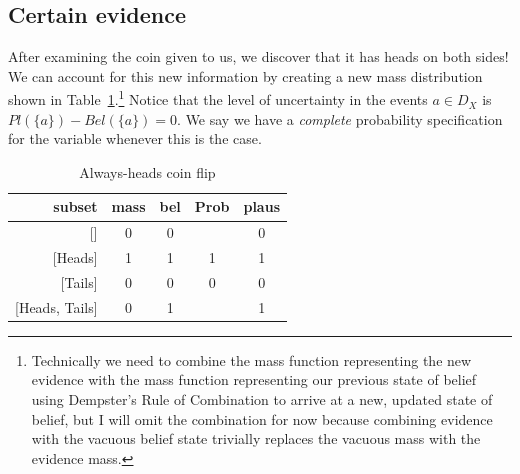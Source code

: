 \documentclass[letterpaper]{article}
\begin{document}
\subsection{Certain evidence}
After examining the coin given to us, we discover that it has heads on both sides!  We can account for this new information by creating a new mass distribution shown in Table~\ref{tab:CoinFlipAllHeads}.\footnote{Technically we need to combine the mass function representing the new evidence with the mass function representing our previous state of belief using Dempster's Rule of Combination to arrive at a new, updated state of belief, but I will omit the combination for now because combining evidence with the vacuous belief state trivially replaces the vacuous mass with the evidence mass.}
Notice that the level of uncertainty in the events $a \in D_X$ is $Pl(\{a\})-Bel(\{a\})=0$.  We say we have a \textit{complete} probability specification for the variable whenever this is the case.  

\begin{table}[htbp]
\centering
\caption{Always-heads coin flip}
\begin{tabular}{rcccc}
\toprule
                subset&mass &bel  &Prob &plaus\\
\midrule
                    {[]}&0    &0    &     &0    \\
               {[Heads]}&1    &1    &1    &1    \\
               {[Tails]}&0    &0    &0    &0    \\
        {[Heads, Tails]}&0    &1    &     &1    \\
\bottomrule
\end{tabular}
\label{tab:CoinFlipAllHeads}
\end{table}
\end{document}
